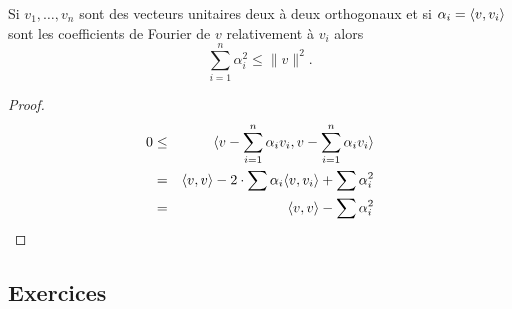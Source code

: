 \begin{theorem}
  \label{thr:4}
  Si $v_1,\dots,v_n$ sont des vecteurs unitaires deux à deux orthogonaux et si $\alpha_i = \langle {v,v_i} \rangle$ sont les coefficients de Fourier de $v$ relativement à $v_i$ alors 
  \begin{displaymath}
    \sum_{i=1}^n \alpha_i^2 \leq \|v\|^2. 
  \end{displaymath}
\end{theorem}

\begin{proof}
  \begin{eqnarray*}
    0 & \leq & \langle {v - \sum_{i=1}^n \alpha_i v_i , v - \sum_{i=1}^n \alpha_i v_i} \rangle \\
     & = & \langle {v,v} \rangle - 2 \cdot \sum \alpha_i \langle {v,v_i} \rangle + \sum \alpha_i^2 \\
    & = & \langle {v,v} \rangle  - \sum \alpha_i^2 \\
  \end{eqnarray*}
\end{proof}



\subsection*{Exercices}

